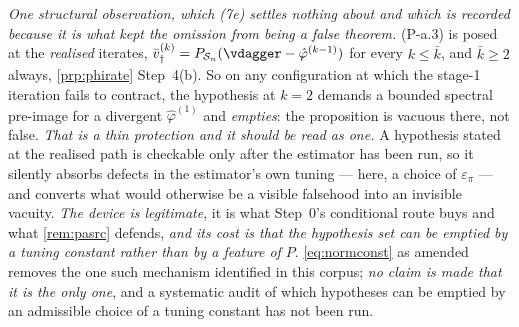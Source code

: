 \begin{remark}
\emph{One structural observation, which \textup{(7e)} settles nothing about and which is recorded
because it is what kept the omission from being a false theorem.} \textup{(P-a.3)} is posed at the
\emph{realised} iterates, $\bar v^{(k)}_\dagger=P_{\mathcal S_n}(\vdagger-\hat\varphi^{(k-1)})$ for every
$k\le\bar k$, and $\bar k\ge2$ always, \cref{prp:phirate} Step~4(b). So on any configuration at which the
stage-1 iteration fails to contract, the hypothesis at $k=2$ demands a bounded spectral pre-image for a
divergent $\hat\varphi^{(1)}$ and \emph{empties}: the proposition is vacuous there, not false.
\emph{That is a thin protection and it should be read as one.} A hypothesis stated at the realised path
is checkable only after the estimator has been run, so it silently absorbs defects in the estimator's own
tuning --- here, a choice of $\varepsilon_\pi$ --- and converts what would otherwise be a visible
falsehood into an invisible vacuity. \emph{The device is legitimate}, it is what Step~0's conditional
route buys and what \cref{rem:pasrc} defends, \emph{and its cost is that the hypothesis set can be
emptied by a tuning constant rather than by a feature of $P$}. \eqref{eq:normconst} as amended removes the
one such mechanism identified in this corpus; \emph{no claim is made that it is the only one}, and a
systematic audit of which hypotheses can be emptied by an admissible choice of a tuning constant has not
been run.
\end{remark}


